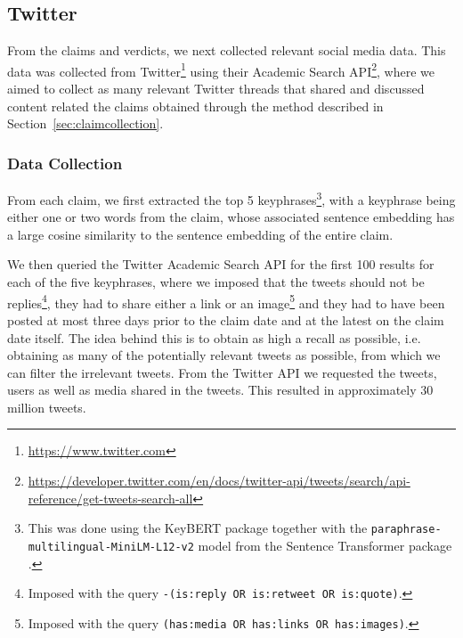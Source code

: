 \documentclass[sigconf,natbib=true,anonymous=false,nonacm]{acmart}
\begin{document}
\begin{table}[ht!]
\begin{center}
\begin{tabular}{c|c|c}
            \bottomrule

        \end{tabular}
        \label{tab:verdict-clf}
    \end{center}
\end{table}

\subsection{Twitter}
\label{sec:twitter}
From the claims and verdicts, we next collected relevant social media data.
This data was collected from Twitter\footnote{\url{https://www.twitter.com}}
using their Academic Search
API\footnote{\url{https://developer.twitter.com/en/docs/twitter-api/tweets/search/api-reference/get-tweets-search-all}},
where we aimed to collect as many relevant Twitter threads that shared and
discussed content related the claims obtained through the method described in
Section~\ref{sec:claimcollection}.

\subsubsection{Data Collection}
\label{sec:twitterdatacollection}
From each claim, we first extracted the top 5 keyphrases\footnote{This was done
using the KeyBERT \citep{grootendorst2020keybert} package together with the
\texttt{paraphrase-multilingual-MiniLM-L12-v2} model from the Sentence
Transformer package \cite{reimers2019sentencebert}.}, with a keyphrase being
either one or two words from the claim, whose associated sentence embedding has
a large cosine similarity to the sentence embedding of the entire claim.

We then queried the Twitter Academic Search API for the first 100 results for
each of the five keyphrases, where we imposed that the tweets should not be
replies\footnote{Imposed with the query \texttt{-(is:reply OR is:retweet OR
is:quote)}.}, they had to share either a link or an image\footnote{Imposed
with the query \texttt{(has:media OR has:links OR has:images)}.} and they had
to have been posted at most three days prior to the claim date and at the
latest on the claim date itself. The idea behind this is to obtain as high a
recall as possible, i.e. obtaining as many of the potentially relevant tweets
as possible, from which we can filter the irrelevant tweets. From the Twitter
API we requested the tweets, users as well as media shared in the tweets. This
resulted in approximately 30 million tweets.
\end{document}
